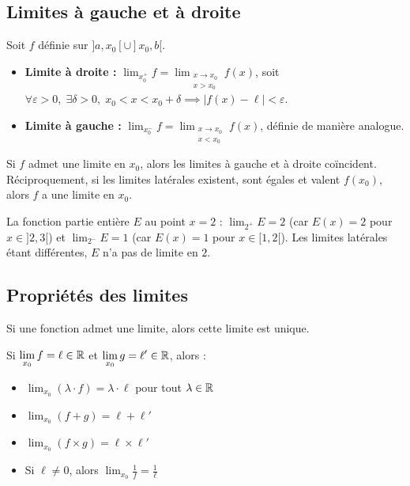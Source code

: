 \subsection{Limites à gauche et à droite}

\begin{defbox}
Soit $f$ définie sur $]a, x_0[ \cup ]x_0, b[$.
\begin{itemize}[leftmargin=1cm]
  \item \textbf{Limite à droite :} $\displaystyle\lim_{x_0^+} f = \lim_{\substack{x \to x_0 \\ x > x_0}} f(x)$, soit $\forall \varepsilon > 0, \; \exists \delta > 0, \; x_0 < x < x_0 + \delta \implies |f(x) - \ell| < \varepsilon$.
  \item \textbf{Limite à gauche :} $\displaystyle\lim_{x_0^-} f = \lim_{\substack{x \to x_0 \\ x < x_0}} f(x)$, définie de manière analogue.
\end{itemize}
Si $f$ admet une limite en $x_0$, alors les limites à gauche et à droite coïncident. Réciproquement, si les limites latérales existent, sont égales et valent $f(x_0)$, alors $f$ a une limite en $x_0$.
\end{defbox}

\begin{exbox}
La fonction partie entière $E$ au point $x = 2$ : $\lim_{2^+} E = 2$ (car $E(x) = 2$ pour $x \in ]2, 3[$) et $\lim_{2^-} E = 1$ (car $E(x) = 1$ pour $x \in [1, 2[$). Les limites latérales étant différentes, $E$ n'a pas de limite en $2$.
\end{exbox}

\subsection{Propriétés des limites}

\begin{propbox}
Si une fonction admet une limite, alors cette limite est unique.
\end{propbox}

\begin{propbox}
Si $\displaystyle\lim_{x_0} f = \ell \in \mathbb{R}$ et $\displaystyle\lim_{x_0} g = \ell' \in \mathbb{R}$, alors :
\begin{itemize}[leftmargin=1cm]
  \item $\displaystyle\lim_{x_0} (\lambda \cdot f) = \lambda \cdot \ell$ \quad pour tout $\lambda \in \mathbb{R}$
  \item $\displaystyle\lim_{x_0} (f + g) = \ell + \ell'$
  \item $\displaystyle\lim_{x_0} (f \times g) = \ell \times \ell'$
  \item Si $\ell \neq 0$, alors $\displaystyle\lim_{x_0} \frac{1}{f} = \frac{1}{\ell}$
\end{itemize}
\end{propbox}

